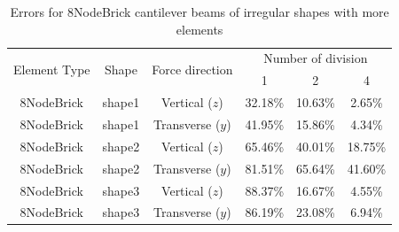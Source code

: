 \documentclass[fleqn,11pt,letter]{article}
\begin{document}
\begin{table}[H]
  \centering
  \caption{Errors for 8NodeBrick cantilever beams of irregular shapes with more elements}
  \label{table Errors for 8NodeBrick cantilever beams of irregular shapes with more elements}
\begin{tabular}{|c|c|c|c|c|c|}
\hline
\multirow{2}{*}{Element Type} & \multirow{2}{*}{Shape}  & \multirow{2}{*}{Force direction}  & \multicolumn{3}{|c|}{Number of division} \\  \cline{4-6}
                        &        &                  &  1 &  2 &  4  \\ \hline
8NodeBrick   & shape1      & Vertical ($z$)   & 32.18\% & 10.63\% & 2.65\%     \\ \hline
8NodeBrick   & shape1      & Transverse ($y$) & 41.95\% & 15.86\% & 4.34\%     \\ \hline
8NodeBrick   & shape2      & Vertical ($z$)   & 65.46\% & 40.01\% & 18.75\%    \\ \hline
8NodeBrick   & shape2      & Transverse ($y$) & 81.51\% & 65.64\% & 41.60\%    \\ \hline
8NodeBrick   & shape3      & Vertical ($z$)   & 88.37\% & 16.67\% & 4.55\%     \\ \hline
8NodeBrick   & shape3      & Transverse ($y$) & 86.19\% & 23.08\% & 6.94\%     \\
\hline
\end{tabular}
\end{table}



\end{document}

